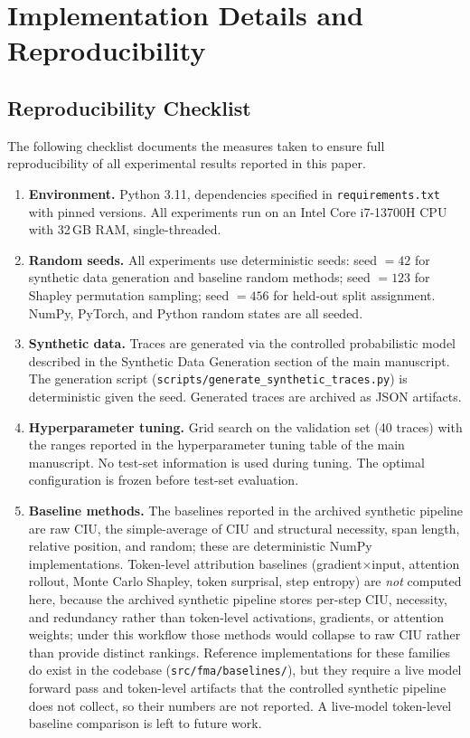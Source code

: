 \documentclass[a4paper,fleqn]{cas-sc}
\begin{document}
\section{Implementation Details and Reproducibility}
\label{app:implementation}

\subsection{Reproducibility Checklist}
\label{app:repro-checklist}

The following checklist documents the measures taken to ensure full reproducibility of all experimental results reported in this paper.

\begin{enumerate}
\item \textbf{Environment.} Python 3.11, dependencies specified in \texttt{requirements.txt} with pinned versions. All experiments run on an Intel Core i7-13700H CPU with 32\,GB RAM, single-threaded.
\item \textbf{Random seeds.} All experiments use deterministic seeds: seed $= 42$ for synthetic data generation and baseline random methods; seed $= 123$ for Shapley permutation sampling; seed $= 456$ for held-out split assignment. NumPy, PyTorch, and Python random states are all seeded.
\item \textbf{Synthetic data.} Traces are generated via the controlled probabilistic model described in the Synthetic Data Generation section of the main manuscript. The generation script (\texttt{scripts/generate\_synthetic\_traces.py}) is deterministic given the seed. Generated traces are archived as JSON artifacts.
\item \textbf{Hyperparameter tuning.} Grid search on the validation set (40 traces) with the ranges reported in the hyperparameter tuning table of the main manuscript. No test-set information is used during tuning. The optimal configuration is frozen before test-set evaluation.
\item \textbf{Baseline methods.} The baselines reported in the archived synthetic pipeline are raw CIU, the simple-average of CIU and structural necessity, span length, relative position, and random; these are deterministic NumPy implementations. Token-level attribution baselines (gradient$\times$input, attention rollout, Monte Carlo Shapley, token surprisal, step entropy) are \emph{not} computed here, because the archived synthetic pipeline stores per-step CIU, necessity, and redundancy rather than token-level activations, gradients, or attention weights; under this workflow those methods would collapse to raw CIU rather than provide distinct rankings. Reference implementations for these families do exist in the codebase (\texttt{src/fma/baselines/}), but they require a live model forward pass and token-level artifacts that the controlled synthetic pipeline does not collect, so their numbers are not reported. A live-model token-level baseline comparison is left to future work.

\end{enumerate}
\end{document}
